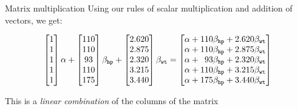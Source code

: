 \documentclass[aspectratio=169,t,11pt,table]{beamer}
\begin{document}
\begin{frame}{Matrix multiplication}
  Using our rules of scalar multiplication and addition of vectors, we get:

  $$
    \begin{bmatrix}1 \\ 1 \\ 1 \\ 1 \\ 1\end{bmatrix} \alpha + 
    \begin{bmatrix}110 \\ 110 \\ 93 \\ 110 \\ 175\end{bmatrix} \beta_{\texttt{hp}} + 
    \begin{bmatrix}2.620 \\ 2.875 \\ 2.320 \\ 3.215 \\ 3.440\end{bmatrix} \beta_{\texttt{wt}} = 
    \begin{bmatrix}
      \alpha + 110 \beta_{\texttt{hp}} + 2.620 \beta_{\texttt{wt}} \\
      \alpha + 110 \beta_{\texttt{hp}} + 2.875 \beta_{\texttt{wt}} \\
      \alpha + \hphantom{0}93 \beta_{\texttt{hp}} + 2.320 \beta_{\texttt{wt}} \\
      \alpha + 110 \beta_{\texttt{hp}} + 3.215 \beta_{\texttt{wt}} \\
      \alpha + 175 \beta_{\texttt{hp}} + 3.440 \beta_{\texttt{wt}} 
    \end{bmatrix}
  $$

  \bigskip
  This is a \emph{linear combination} of the columns of the matrix
\end{frame}
\end{document}
